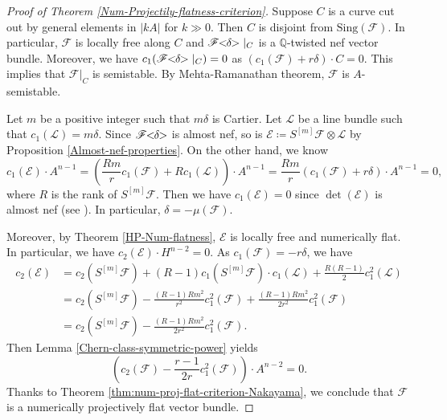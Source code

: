 \documentclass[english,reqno]{amsart}
\newcommand\bbQ{{\mathbb Q}}
\newcommand\sE{{\mathscr E}}
\newcommand\sF{{\mathscr F}}
\newcommand\sL{{\mathscr L}}
\theoremstyle{plain}
\theoremstyle{definition}
\numberwithin{equation}{section} %
\begin{document}
\begin{proof}[Proof of Theorem \ref{Num-Projectily-flatness-criterion}]

    Suppose $C$ is a curve cut out by general elements in $\vert kA\vert$ for $k\gg 0$. Then $C$ is disjoint from   $\mathrm{Sing}(\sF)$.
    In particular, $\sF$ is locally free along $C$ and $\sF\hspace{-0.8ex}<\hspace{-0.8ex}\delta\hspace{-0.8ex}>\vert_C$ is a $\bbQ$-twisted nef vector bundle.
    Moreover,  we have $c_1(\sF\hspace{-0.8ex}<\hspace{-0.8ex}\delta\hspace{-0.8ex}>\vert_C)=0$ as $(c_1(\sF)+r\delta)\cdot C=0$. This implies that $\sF\vert_C$ is semistable. By Mehta-Ramanathan  theorem, $\sF$  is $A$-semistable.

    Let $m$ be a positive integer such that $m\delta$ is Cartier. Let $\sL$ be a line bundle such that $c_1(\sL)=m\delta$.
    Since $\sF\hspace{-0.8ex}<\hspace{-0.8ex}\delta\hspace{-0.8ex}>$ is almost nef, so is   $\sE\coloneqq S^{[m]}\sF\otimes \sL$ by Proposition \ref{Almost-nef-properties}. On the other hand, we know
    \[c_1(\sE)\cdot A^{n-1}=\left(\frac{Rm}{r}c_1(\sF)+Rc_1(\sL)\right)\cdot A^{n-1}=\frac{Rm}{r}(c_1(\sF)+r\delta)\cdot A^{n-1}=0,\]
    where $R$ is the rank of $S^{[m]}\sF$. Then we have $c_1(\sE)=0$ since $\det(\sE)$ is almost nef (see \cite[Lemma 6.5]{Peternell1994}).
    In particular, $\delta=-\mu(\sF)$.


     Moreover, by Theorem \ref{HP-Num-flatness}, $\sE$ is locally free and numerically flat. In particular, we have $c_2(\sE)\cdot H^{n-2}=0$. As $c_1(\sF)=-r\delta$, we have
    \begin{align*}
    c_2(\sE) & =c_2(S^{[m]}\sF)+(R-1)c_1(S^{[m]}\sF)\cdot c_1(\sL)+\frac{R(R-1)}{2}c_1^2(\sL)\\
    & = c_2(S^{[m]}\sF)-\frac{(R-1)Rm^2}{r^2}c^2_1(\sF)+\frac{(R-1)Rm^2}{2r^2}c_1^2(\sF)\\
    & = c_2(S^{[m]}\sF)- \frac{(R-1)Rm^2}{2r^2}c_1^2(\sF).
    \end{align*}
    Then  Lemma \ref{Chern-class-symmetric-power} yields
    \[\left(c_2(\sF)-\frac{r-1}{2r}c_1^2(\sF)\right)\cdot A^{n-2}=0.\]
    Thanks to Theorem \ref{thm:num-proj-flat-criterion-Nakayama}, we conclude that $\sF$ is a numerically projectively flat vector bundle.
\end{proof}
\end{document}
